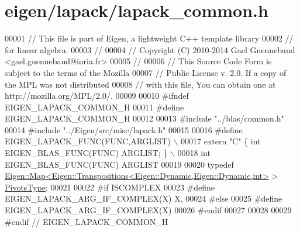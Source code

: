 \hypertarget{eigen_2lapack_2lapack__common_8h_source}{}\section{eigen/lapack/lapack\+\_\+common.h}
\label{eigen_2lapack_2lapack__common_8h_source}

\begin{DoxyCode}
00001 \textcolor{comment}{// This file is part of Eigen, a lightweight C++ template library}
00002 \textcolor{comment}{// for linear algebra.}
00003 \textcolor{comment}{//}
00004 \textcolor{comment}{// Copyright (C) 2010-2014 Gael Guennebaud <gael.guennebaud@inria.fr>}
00005 \textcolor{comment}{//}
00006 \textcolor{comment}{// This Source Code Form is subject to the terms of the Mozilla}
00007 \textcolor{comment}{// Public License v. 2.0. If a copy of the MPL was not distributed}
00008 \textcolor{comment}{// with this file, You can obtain one at http://mozilla.org/MPL/2.0/.}
00009 
00010 \textcolor{preprocessor}{#ifndef EIGEN\_LAPACK\_COMMON\_H}
00011 \textcolor{preprocessor}{#define EIGEN\_LAPACK\_COMMON\_H}
00012 
00013 \textcolor{preprocessor}{#include "../blas/common.h"}
00014 \textcolor{preprocessor}{#include "../Eigen/src/misc/lapack.h"}
00015 
00016 \textcolor{preprocessor}{#define EIGEN\_LAPACK\_FUNC(FUNC,ARGLIST)               \(\backslash\)}
00017 \textcolor{preprocessor}{  extern "C" \{ int EIGEN\_BLAS\_FUNC(FUNC) ARGLIST; \}   \(\backslash\)}
00018 \textcolor{preprocessor}{  int EIGEN\_BLAS\_FUNC(FUNC) ARGLIST}
00019 
00020 \textcolor{keyword}{typedef} \hyperlink{group___core___module_class_eigen_1_1_map}{Eigen::Map<Eigen::Transpositions<Eigen::Dynamic,Eigen::Dynamic,int>}
       > \hyperlink{group___core___module_class_eigen_1_1_map}{PivotsType};
00021 
00022 \textcolor{preprocessor}{#if ISCOMPLEX}
00023 \textcolor{preprocessor}{#define EIGEN\_LAPACK\_ARG\_IF\_COMPLEX(X) X,}
00024 \textcolor{preprocessor}{#else}
00025 \textcolor{preprocessor}{#define EIGEN\_LAPACK\_ARG\_IF\_COMPLEX(X)}
00026 \textcolor{preprocessor}{#endif}
00027 
00028 
00029 \textcolor{preprocessor}{#endif // EIGEN\_LAPACK\_COMMON\_H}
\end{DoxyCode}
